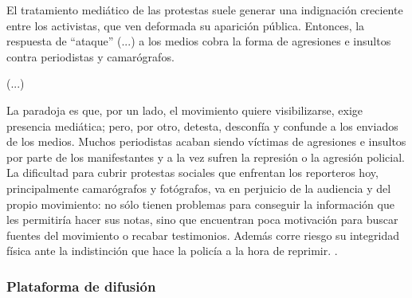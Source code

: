 \documentclass[letterpaper, 11pt]{book}
\theoremstyle{definition}
\theoremstyle{remark}
\begin{document}
\begin{center}
    \begin{minipage}{0.9\linewidth}
        {\setlength{\parindent}{12pt}\small
          El tratamiento mediático de las protestas suele generar una indignación creciente entre los activistas, que ven deformada su aparición pública. 
          Entonces, la respuesta de ``ataque'' (...) a los medios cobra la forma de agresiones e insultos contra periodistas y camarógrafos.
          
          (...)
          
          La paradoja es que, por un lado, el movimiento quiere visibilizarse, exige presencia mediática; pero, por otro, detesta, desconfía y confunde a los enviados de los medios. 
          Muchos periodistas acaban siendo víctimas de agresiones e insultos por parte de los manifestantes y a la vez sufren la represión o la agresión policial. 
          La dificultad para cubrir protestas sociales que enfrentan los reporteros hoy, principalmente camarógrafos y fotógrafos, va en perjuicio de la audiencia y del propio movimiento: no sólo tienen problemas para conseguir la información que les permitiría hacer sus notas, sino que encuentran poca motivación para buscar fuentes del movimiento o recabar testimonios. 
          Además corre riesgo su integridad física ante la indistinción que hace la policía a la hora de reprimir.
          \normalsize \citep[43--44]{2013_Rovira_ActivismoMediatico}.
        }
    \end{minipage}
\end{center}




\subsubsection{Plataforma de difusión}
\label{sec:Sesgo_plataforma}
\end{document}
